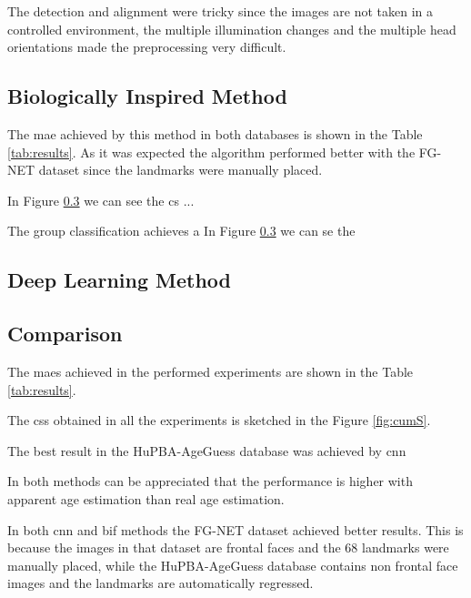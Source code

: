 The detection and alignment were tricky since the images are not taken in a controlled environment, the multiple illumination changes and the multiple head orientations made the preprocessing very difficult.

\subsection{Biologically Inspired Method}

The \gls{mae} achieved by this method in both databases is shown in the Table \ref{tab:results}. As it was expected the algorithm performed better with the FG-NET dataset since the landmarks were manually placed.

In Figure \ref{} we can see the \gls{cs} ...

The group classification achieves a 
In Figure \ref{} we can se the 

\subsection{Deep Learning Method}

\subsection{Comparison}


The \glspl{mae} achieved in the performed experiments are shown in the Table \ref{tab:results}.

The \glspl{cs} obtained in all the experiments is sketched in the Figure \ref{fig:cumS}.

The best result in the HuPBA-AgeGuess database was achieved by \gls{cnn}


In both methods can be appreciated that the performance is higher with apparent age estimation than real age estimation. 

In both \gls{cnn} and \gls{bif} methods the FG-NET dataset achieved better results. This is because the images in that dataset are frontal faces and the 68 landmarks were manually placed, while the HuPBA-AgeGuess database contains non frontal face images and the landmarks are automatically regressed.

